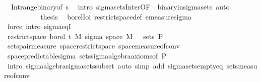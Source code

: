 \begin{isabellebody}
\ {\isacharasterisk}{\kern0pt}\ Int{\isacharunderscore}{\kern0pt}range{\isacharunderscore}{\kern0pt}binary{\isacharbrackleft}{\kern0pt}of\ {\isachardoublequoteopen}{\isacharbraceleft}{\kern0pt}s{\isacharless}{\kern0pt}{\isachardot}{\kern0pt}{\isachardot}{\kern0pt}{\isacharbraceright}{\kern0pt}{\isachardoublequoteclose}{\isacharbrackright}{\kern0pt}\ \isamarkupfalse%
\ {\isacharparenleft}{\kern0pt}intro\ sigma{\isacharunderscore}{\kern0pt}sets{\isacharunderscore}{\kern0pt}Inter{\isacharbrackleft}{\kern0pt}OF\ {\isacharunderscore}{\kern0pt}\ binary{\isacharunderscore}{\kern0pt}in{\isacharunderscore}{\kern0pt}sigma{\isacharunderscore}{\kern0pt}sets{\isacharbrackright}{\kern0pt}{\isacharparenright}{\kern0pt}\ auto\ \ \ \ \ \ \ \ \isanewline
\ \ \ \ \isamarkupfalse%
\isanewline
\ \ \ \ \isamarkupfalse%
\ {\isacharquery}{\kern0pt}thesis\ \isamarkupfalse%
\ borel{\isacharunderscore}{\kern0pt}Ioi\ restrict{\isacharunderscore}{\kern0pt}space{\isacharunderscore}{\kern0pt}def\ emeasure{\isacharunderscore}{\kern0pt}sigma\ \isamarkupfalse%
\ {\isacharparenleft}{\kern0pt}force\ intro{\isacharcolon}{\kern0pt}\ sigma{\isacharunderscore}{\kern0pt}eqI{\isacharparenright}{\kern0pt}\isanewline
\ \ \isamarkupfalse%
\isanewline
\ \ \isamarkupfalse%
\ \isamarkupfalse%
\ {\isachardoublequoteopen}restrict{\isacharunderscore}{\kern0pt}space\ borel\ {\isacharbraceleft}{\kern0pt}t\ {\isasymOtimes}\isactrlsub M\ sigma\ {\isacharparenleft}{\kern0pt}space\ M{\isacharparenright}{\kern0pt}\ {\isacharbraceleft}{\kern0pt}{\isacharbraceright}{\kern0pt}\ {\isasymsubseteq}\ sets\ {\isasymSigma}\isactrlsub P{\isachardoublequoteclose}\ \isanewline
\ \ \ \ \isamarkupfalse%
\ sets{\isacharunderscore}{\kern0pt}pair{\isacharunderscore}{\kern0pt}measure\ space{\isacharunderscore}{\kern0pt}restrict{\isacharunderscore}{\kern0pt}space\ space{\isacharunderscore}{\kern0pt}measure{\isacharunderscore}{\kern0pt}of{\isacharunderscore}{\kern0pt}conv\isanewline
\ \ \ \ \isamarkupfalse%
\ space{\isacharunderscore}{\kern0pt}predictable{\isacharunderscore}{\kern0pt}sigma\ sets{\isachardot}{\kern0pt}sigma{\isacharunderscore}{\kern0pt}algebra{\isacharunderscore}{\kern0pt}axioms{\isacharbrackleft}{\kern0pt}of\ {\isasymSigma}\isactrlsub P{\isacharbrackright}{\kern0pt}\ \isanewline
\ \ \ \ \isamarkupfalse%
\ {\isacharparenleft}{\kern0pt}intro\ sigma{\isacharunderscore}{\kern0pt}algebra{\isachardot}{\kern0pt}sigma{\isacharunderscore}{\kern0pt}sets{\isacharunderscore}{\kern0pt}subset{\isacharparenright}{\kern0pt}\ {\isacharparenleft}{\kern0pt}auto\ simp\ add{\isacharcolon}{\kern0pt}\ sigma{\isacharunderscore}{\kern0pt}sets{\isacharunderscore}{\kern0pt}empty{\isacharunderscore}{\kern0pt}eq\ sets{\isacharunderscore}{\kern0pt}measure{\isacharunderscore}{\kern0pt}of{\isacharunderscore}{\kern0pt}conv{\isacharparenright}{\kern0pt}\isanewline

\end{isabellebody}
